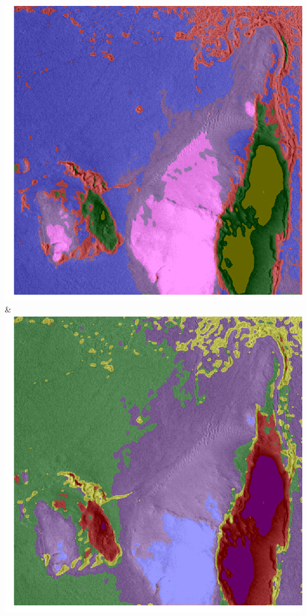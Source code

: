 \begin{table}[h!]
\begin{tabularx}{\textwidth}
		\includegraphics[width=0.9\linewidth]{images/gen/convolution_number/p03_04.png_5.png} &
		\includegraphics[width=0.9\linewidth]{images/gen/convolution_number/p03_04.png_6.png} \\
		\bottomrule
	\end{tabularx}
	\caption{Vergleich der Auswirkungen der Änderung der Anzahl an Konvolutionsschichten. Die Farben der jeweiligen Cluster wurden zufällig gewählt.}
	\label{tab:n_layers_comparision}
\end{table}

